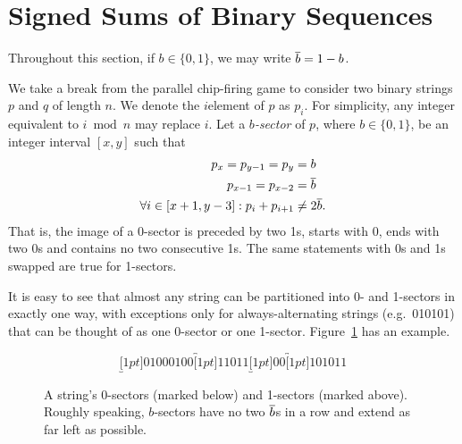 \section{Signed Sums of Binary Sequences}\label{binSeq}
Throughout this section, if $b \in \{0,1\}$, we may write $\overline{b} = 1-b$.

We take a break from the parallel chip-firing game to consider two binary
strings $p$ and $q$ of length $n$. We denote the $i$\xth element of $p$ as
$p_i$. For simplicity, any integer equivalent to $i \bmod n$ may replace
$i$. Let a \emph{$b$-sector} of $p$, where $b \in \{0,1\}$, be an integer
interval $[x,y]$ such that
\begin{align*}
  p_x = p_{y-1} = p_y &= b \\
  p_{x-1} = p_{x-2} &= \overline{b} \\
  \forall i \in [x+1, y-3]: p_i + p_{i+1} &\neq 2\overline{b}.
\end{align*}
That is, the image of a 0-sector is preceded by two 1s, starts with 0, ends
with two 0s and contains no two consecutive 1s. The same statements with 0s and
1s swapped are true for 1-sectors.

It is easy to see that almost any string can be partitioned into 0- and
1-sectors in exactly one way, with exceptions only for always-alternating
strings (e.g.\ 010101) that can be thought of as one 0-sector or one
1-sector. Figure~\ref{sectorEx} has an example.

\begin{figure}
  \[
    \underbracket[1pt]{01000100}\overbracket[1pt]{11011}\underbracket[1pt]{00}
    \overbracket[1pt]{101011}
  \]
  \caption{A string's 0-sectors (marked below) and 1-sectors (marked
    above). Roughly speaking, $b$-sectors have no two $\overline{b}$s in a row and
    extend as far left as possible.}
  \label{sectorEx}
\end{figure}

